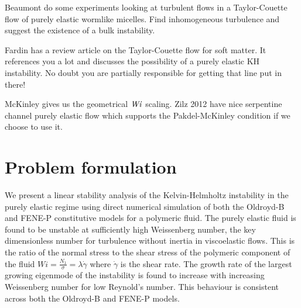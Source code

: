 \documentclass{jfm}
\newcommand\Wi{\mbox{\textit{Wi}}}
\begin{document}
Beaumont \citep{Beaumont2013} do some experiments looking at turbulent flows in
a Taylor-Couette flow of purely elastic wormlike micelles. Find inhomogeneous
turbulence and suggest the existence of a bulk instability.

Fardin \citep{Fardin2014} has a review article on the Taylor-Couette flow for
soft matter. It references you a lot and discusses the possibility of a purely
elastic KH instability. No doubt you are partially responsible for getting that
line put in there!

McKinley \citep{McKinley1996} gives us the geometrical $\Wi$ scaling. Zilz 2012
\citep{Zilz2012} have nice serpentine channel purely elastic flow which
supports the Pakdel-McKinley condition if we choose to use it.

\section{Problem formulation}

We present a linear stability analysis of the Kelvin-Helmholtz instability in
the purely elastic regime using direct numerical simulation of both the
Oldroyd-B and FENE-P constitutive models for a polymeric fluid. The purely
elastic fluid is found to be unstable at sufficiently high Weissenberg number,
the key dimensionless number for turbulence without inertia in viscoelastic
flows. This is the ratio of the normal stress to the shear stress of the
polymeric component of the fluid $Wi = \frac{N_{1}}{\sigma} = \lambda
\dot{\gamma}$ where $\dot{\gamma}$ is the shear rate.  The growth rate of the
largest growing eigenmode of the instability is found to increase with
increasing Weissenberg number for low Reynold's number. This behaviour is
consistent across both the Oldroyd-B and FENE-P models.
\end{document}
